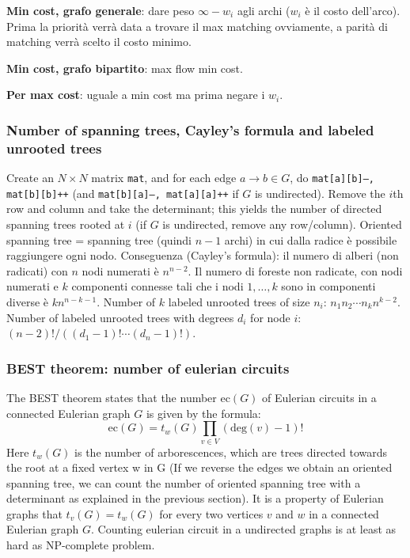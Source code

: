 \textbf{Min cost, grafo generale}: dare peso $\infty - w_i$ agli archi ($w_i$ è il costo dell'arco). Prima la priorità verrà data a trovare il max matching ovviamente, a parità di matching verrà scelto il costo minimo.

\textbf{Min cost, grafo bipartito}: max flow min cost.

\textbf{Per max cost}: uguale a min cost ma prima negare i $w_i$.

\subsubsection{Number of spanning trees, Cayley's formula and labeled unrooted trees}
		Create an $N\times N$ matrix \texttt{mat}, and for each edge $a \rightarrow b \in G$, do
		\texttt{mat[a][b]--, mat[b][b]++} (and \texttt{mat[b][a]--, mat[a][a]++} if $G$ is undirected).
		Remove the $i$th row and column and take the determinant; this yields the number of directed spanning trees rooted at $i$
		(if $G$ is undirected, remove any row/column). Oriented spanning tree = spanning tree (quindi $n-1$ archi) in cui dalla radice è possibile raggiungere ogni nodo. Conseguenza (Cayley's formula): il numero di alberi (non radicati) con $n$ nodi numerati è $n^{n-2}$. Il numero di foreste non radicate, con nodi numerati e $k$ componenti connesse tali che i nodi $1,\dots,k$ sono in componenti diverse è $kn^{n-k-1}$.
		Number of $k$ labeled unrooted trees of size $n_i$: $n_1n_2\cdots n_k n^{k-2}$.
		Number of labeled unrooted trees with degrees $d_i$ for node $i$: $(n-2)! / ((d_1-1)! \cdots (d_n-1)!)$.

\subsubsection{BEST theorem: number of eulerian circuits}
The BEST theorem states that the number ec$(G)$ of Eulerian circuits in a connected Eulerian graph $G$ is given by the formula:
$$\text{ec}(G)=t_w(G)\prod_{v\in V}(\text{deg}(v)-1)!$$
Here $t_w(G)$ is the number of arborescences, which are trees directed towards the root at a fixed vertex w in G (If we reverse the edges we obtain an oriented spanning tree, we can count the number of oriented spanning tree with a determinant as explained in the previous section).
It is a property of Eulerian graphs that $t_v(G) = t_w(G)$ for every two vertices $v$ and $w$ in a connected Eulerian graph $G$. Counting eulerian circuit in a undirected graphs is at least as hard as NP-complete problem.

